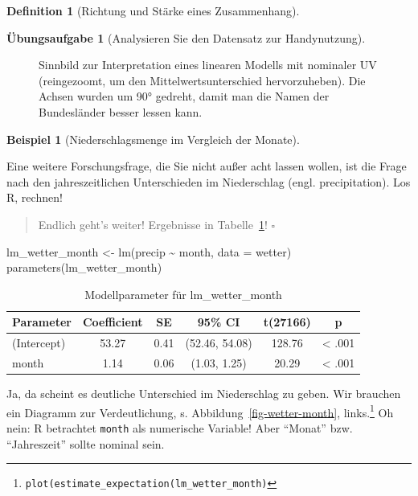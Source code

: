 \documentclass[
  a4paper,
  DIV=11]{scrreprt}
\newenvironment{Shaded}{\begin{snugshade}}{\end{snugshade}}
\newcommand{\AttributeTok}[1]{\textcolor[rgb]{0.40,0.45,0.13}{#1}}
\newcommand{\FunctionTok}[1]{\textcolor[rgb]{0.28,0.35,0.67}{#1}}
\newcommand{\NormalTok}[1]{\textcolor[rgb]{0.00,0.23,0.31}{#1}}
\newcommand{\OtherTok}[1]{\textcolor[rgb]{0.00,0.23,0.31}{#1}}
\newcommand{\SpecialCharTok}[1]{\textcolor[rgb]{0.37,0.37,0.37}{#1}}
\theoremstyle{definition}
\newtheorem{exercise}{Übungsaufgabe}[chapter]
\theoremstyle{definition}
\newtheorem{example}{Beispiel}[chapter]
\theoremstyle{definition}
\newtheorem{definition}{Definition}[chapter]
\theoremstyle{remark}
\begin{document}
\begin{definition}[Richtung und Stärke eines
Zusammenhang]
\begin{exercise}[Analysieren Sie den Datensatz zur
Handynutzung]
\begin{figure}
{}

\caption{\label{fig-bin-nom}Sinnbild zur Interpretation eines linearen
Modells mit nominaler UV (reingezoomt, um den Mittelwertsunterschied
hervorzuheben). Die Achsen wurden um 90° gedreht, damit man die Namen
der Bundesländer besser lessen kann.}

\end{figure}%

\begin{example}[Niederschlagsmenge im Vergleich der
Monate]\protect\hypertarget{exm-months}{}\label{exm-months}

Eine weitere Forschungsfrage, die Sie nicht außer acht lassen wollen,
ist die Frage nach den jahreszeitlichen Unterschieden im Niederschlag
(engl. precipitation). Los R, rechnen!

\begin{quote}
{} Endlich geht's weiter! Ergebnisse in
Tabelle~\ref{tbl-lm_wetter-month}! \(\square\)
\end{quote}

\end{example}

\begin{Shaded}
\begin{Highlighting}[]
\NormalTok{lm\_wetter\_month }\OtherTok{\textless{}{-}} \FunctionTok{lm}\NormalTok{(precip }\SpecialCharTok{\textasciitilde{}}\NormalTok{ month, }\AttributeTok{data =}\NormalTok{ wetter)}
\FunctionTok{parameters}\NormalTok{(lm\_wetter\_month)}
\end{Highlighting}
\end{Shaded}

\begin{longtable}[]{@{}lccccc@{}}

\caption{\label{tbl-lm_wetter-month}Modellparameter für
lm\_wetter\_month}

\tabularnewline

\toprule\noalign{}
Parameter & Coefficient & SE & 95\% CI & t(27166) & p \\
\midrule\noalign{}
\endhead
\bottomrule\noalign{}
\endlastfoot
(Intercept) & 53.27 & 0.41 & (52.46, 54.08) & 128.76 & \textless{}
.001 \\
month & 1.14 & 0.06 & (1.03, 1.25) & 20.29 & \textless{} .001 \\

\end{longtable}

Ja, da scheint es deutliche Unterschied im Niederschlag zu geben. Wir
brauchen ein Diagramm zur Verdeutlichung, s.
Abbildung~\ref{fig-wetter-month}, links.\footnote{\texttt{plot(estimate\_expectation(lm\_wetter\_month)}}
Oh nein: R betrachtet \texttt{month} als numerische Variable! Aber
``Monat'' bzw. ``Jahreszeit'' sollte nominal sein.


\end{exercise}
\end{definition}
\end{document}
